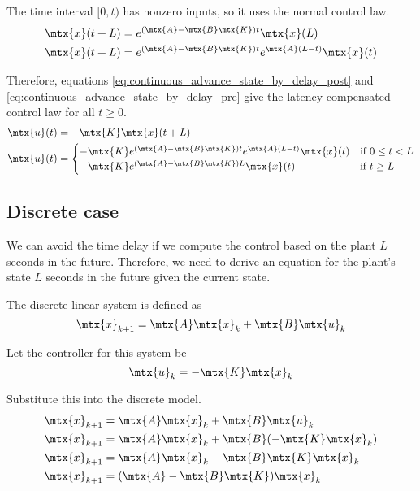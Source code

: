 The time interval $[0, t)$ has nonzero inputs, so it uses the normal control
law.
\begin{align}
  \mtx{x}(t + L) &= e^{(\mtx{A} - \mtx{B}\mtx{K})t} \mtx{x}(L) \nonumber \\
  \mtx{x}(t + L) &= e^{(\mtx{A} - \mtx{B}\mtx{K})t} e^{\mtx{A}(L - t)}
    \mtx{x}(t) \label{eq:continuous_advance_state_by_delay_pre}
\end{align}

Therefore, equations \eqref{eq:continuous_advance_state_by_delay_post} and
\eqref{eq:continuous_advance_state_by_delay_pre} give the latency-compensated
control law for all $t \geq 0$.
\begin{align}
  \mtx{u}(t) &= -\mtx{K} \mtx{x}(t + L) \nonumber \\
  \mtx{u}(t) &=
  \begin{cases}
    -\mtx{K} e^{(\mtx{A} - \mtx{B}\mtx{K})t} e^{\mtx{A}(L - t)} \mtx{x}(t) &
      \text{if } 0 \leq t < L \\
    -\mtx{K} e^{(\mtx{A} - \mtx{B}\mtx{K})L} \mtx{x}(t) & \text{if } t \geq L
  \end{cases}
\end{align}

\subsection{Discrete case}

We can avoid the time delay if we compute the control based on the plant $L$
seconds in the future. Therefore, we need to derive an equation for the plant's
state $L$ seconds in the future given the current state.

The discrete linear system is defined as
\begin{equation*}
  \mtx{x}_{k+1} = \mtx{A}\mtx{x}_k + \mtx{B}\mtx{u}_k
\end{equation*}

Let the controller for this system be
\begin{equation*}
  \mtx{u}_k = -\mtx{K}\mtx{x}_k
\end{equation*}

Substitute this into the discrete model.
\begin{align*}
  \mtx{x}_{k+1} &= \mtx{A}\mtx{x}_k + \mtx{B}\mtx{u}_k \\
  \mtx{x}_{k+1} &= \mtx{A}\mtx{x}_k + \mtx{B}(-\mtx{K}\mtx{x}_k) \\
  \mtx{x}_{k+1} &= \mtx{A}\mtx{x}_k - \mtx{B}\mtx{K}\mtx{x}_k \\
  \mtx{x}_{k+1} &= (\mtx{A} - \mtx{B}\mtx{K}) \mtx{x}_k
\end{align*}

